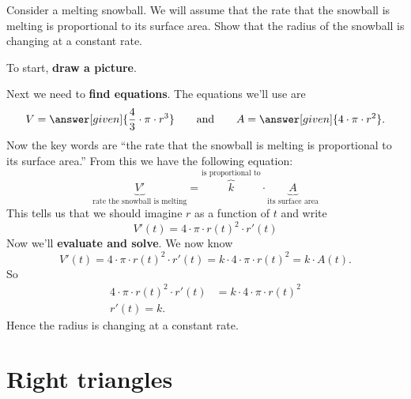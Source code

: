 \documentclass{ximera}
\begin{document}
\begin{example}
  Consider a melting snowball. We will assume that the rate that the
  snowball is melting is proportional to its surface area. Show that
  the radius of the snowball is changing at a constant rate.
  
\begin{explanation}
  To start, \textbf{draw a picture}.
  \begin{image}
  \end{image}
  Next we need to \textbf{find equations}. The equations we'll use are
  \[
  V = \answer[given]{\frac{4}{3}\cdot \pi \cdot r^3} \qquad\text{and}\qquad A = \answer[given]{4\cdot
  \pi \cdot r^2}.
  \]
  Now the key words are ``the rate that the snowball is melting is
  proportional to its surface area.'' From this we have the following
  equation:
  \[
  \underbrace{V'}_{\text{rate the snowball is melting}} =
  \overbrace{k}^{\text{is proportional to}}\cdot
  \underbrace{A}_{\text{its surface area}}
  \]
  This tells us that we should imagine $r$ as a function of $t$ and write
  \[
  V'(t) = 4\cdot \pi\cdot r(t)^2 \cdot r'(t)
  \]
  Now we'll \textbf{evaluate and solve}. We now know
  \[
  V'(t) = 4\cdot \pi \cdot r(t)^2 \cdot r'(t) =  k\cdot 4\cdot
  \pi \cdot r(t)^2 = k\cdot A(t).
  \]
  So
  \begin{align*}
  4\cdot \pi \cdot r(t)^2 \cdot r'(t) &=  k\cdot 4\cdot
  \pi \cdot r(t)^2\\
  r'(t) = k.
  \end{align*}
  Hence the radius is changing at a constant rate. 
\end{explanation}
\end{example}





\section{Right triangles}
\end{document}
